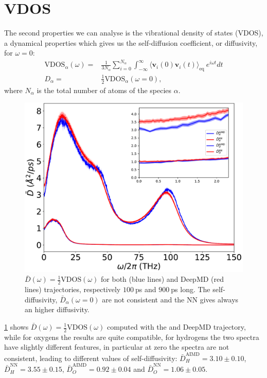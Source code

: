 \documentclass[%
 reprint,
 amsmath,amssymb,
 aps,
prb,
]{revtex4-2}
\begin{document}
\section{VDOS}
The second properties we can analyse is the vibrational density of states (VDOS), a dynamical properties which gives us the self-diffusion coefficient, or diffusivity, for $\omega=0$:
\begin{align}
\text{VDOS}_{\alpha}(\omega) =& \frac{1}{3N_{\alpha}}\sum_{i=0}^{N_{\alpha}}\int_{-\infty}^{\infty} \langle \mathbf{v}_i(0)\mathbf{v}_i(t) \rangle_{\text{eq}}~ e^{i \omega t} dt \\
D_{\alpha} = & \frac{1}{2}\text{VDOS}_{\alpha}(\omega = 0),
\end{align}
where $N_{\alpha}$ is the total number of atoms of the species $\alpha$. 

\begin{figure}[tbh]
    \centering
    \includegraphics[width=\linewidth]{figs/VDOS.pdf}
    \caption{$\bar{D}(\omega) = \frac{1}{2}\text{VDOS}(\omega)$ for both \ai (blue lines) and DeepMD (red lines) trajectories, respectively $100~$ps and $900~$ps long. The self-diffusivity, $\bar{D}_{\alpha}(\omega=0)$ are not consistent and the NN gives always an higher diffusivity.}
    \label{fig:VDOS}
\end{figure}

\cref{fig:VDOS} shows  $\bar{D}(\omega)=\frac{1}{2}\text{VDOS}(\omega)$ computed with the \ai and DeepMD trajectory, while for oxygens the results are quite compatible, for hydrogens the two spectra have slightly different features, in particular at zero the spectra are not consistent, leading to different values of self-diffusivity: $\bar{D}_{H}^{\text{AIMD}}=3.10 \pm 0.10$,  $\bar{D}_{H}^{\text{NN}}=3.55 \pm 0.15$, $\bar{D}_{O}^{\text{AIMD}}=0.92 \pm 0.04$ and $\bar{D}_{O}^{\text{NN}}=1.06  \pm 0.05$.
\end{document}
